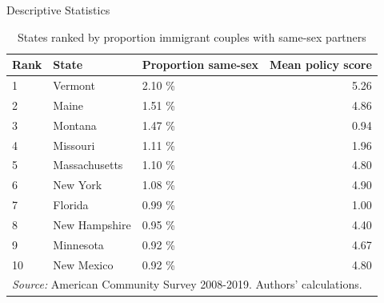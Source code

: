 \documentclass[
  ignorenonframetext,
]{beamer}
\begin{document}
\begin{frame}{Descriptive Statistics}
\protect\hypertarget{descriptive-statistics-3}{}
\begin{table}

\caption{\label{tab:state-tab}States ranked by proportion immigrant couples with same-sex partners}
\centering
\fontsize{9}{11}\selectfont
\begin{tabular}[t]{lllr}
\toprule
Rank & State & Proportion same-sex & Mean policy score\\
\midrule
1 & Vermont & 2.10 \% & 5.26\\
2 & Maine & 1.51 \% & 4.86\\
3 & Montana & 1.47 \% & 0.94\\
4 & Missouri & 1.11 \% & 1.96\\
5 & Massachusetts & 1.10 \% & 4.80\\
6 & New York & 1.08 \% & 4.90\\
7 & Florida & 0.99 \% & 1.00\\
8 & New Hampshire & 0.95 \% & 4.40\\
9 & Minnesota & 0.92 \% & 4.67\\
10 & New Mexico & 0.92 \% & 4.80\\
\bottomrule
\multicolumn{4}{l}{\rule{0pt}{1em}\textit{Source:} American Community Survey 2008-2019. Authors' calculations.}\\
\end{tabular}
\end{table}
\end{frame}
\end{document}
